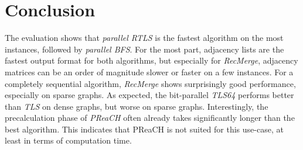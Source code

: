 \documentclass[12pt,a4paper,twoside]{article}
\begin{document}


\section{Conclusion}

The evaluation shows that \emph{parallel RTLS} is the fastest algorithm on the most instances, followed by \emph{parallel BFS}. For the most part, adjacency lists are the fastest output format for both algorithms, but especially for \emph{RecMerge}, adjacency matrices can be an order of magnitude slower or faster on a few instances. For a completely sequential algorithm, \emph{RecMerge} shows surprisingly good performance, especially on sparse graphs.
As expected, the bit-parallel \emph{TLS64} performs better than \emph{TLS} on dense graphs, but worse on sparse graphs.
Interestingly, the precalculation phase of \emph{PReaCH} often already takes significantly longer than the best algorithm. This indicates that PReaCH is not suited for this use-case, at least in terms of computation time.




\end{document}
